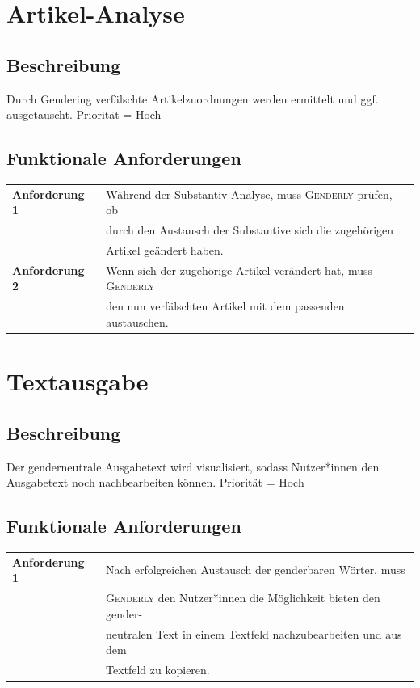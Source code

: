 \documentclass[paper=a4, parskip=half]{scrreprt}
\newcommand{\Genderly}{\textsc{Genderly}}
\begin{document}
\section{Artikel-Analyse}
\subsection{Beschreibung}
Durch Gendering verfälschte Artikelzuordnungen werden ermittelt und ggf. ausgetauscht. Priorität = Hoch
\subsection{Funktionale Anforderungen}
\begin{table}[!htb]
\begin{tabular}{ll}
\textbf{Anforderung 1} & Während der Substantiv-Analyse, muss \Genderly{} prüfen, ob \\
& durch den Austausch der Substantive sich die zugehörigen \\
& Artikel geändert haben. \vspace{0.15cm} \\
\textbf{Anforderung 2} & Wenn sich der zugehörige Artikel verändert hat, muss \Genderly{} \\
& den nun verfälschten Artikel mit dem passenden austauschen. \vspace{0.15cm} \\
\end{tabular}
\end{table}

\section{Textausgabe}
\subsection{Beschreibung}
Der genderneutrale Ausgabetext wird visualisiert, sodass Nutzer*innen den Ausgabetext noch nachbearbeiten können. Priorität = Hoch
\subsection{Funktionale Anforderungen}
\begin{table}[!htb]
\begin{tabular}{ll}
\textbf{Anforderung 1} & Nach erfolgreichen Austausch der genderbaren Wörter, muss \\
& \Genderly{} den Nutzer*innen die Möglichkeit bieten den gender- \\
& neutralen Text in einem Textfeld nachzubearbeiten und aus dem \\
& Textfeld zu kopieren. \vspace{0.15cm} \\
\end{tabular}
\end{table}
\end{document}
